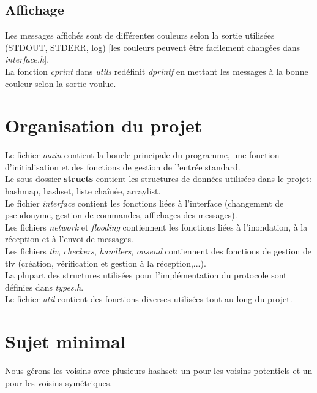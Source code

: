 \documentclass[a4paper,10pt]{article} %
\begin{document}
\subsection{Affichage}
Les messages affichés sont de différentes couleurs selon la sortie utilisées (STDOUT, STDERR, log) [les couleurs peuvent être facilement changées dans \textit{interface.h}].\\

La fonction \textit{cprint} dans \textit{utils} redéfinit \textit{dprintf} en mettant les messages à la bonne couleur selon la sortie voulue.

\section{Organisation du projet}
Le fichier \textit{main} contient la boucle principale du programme, une fonction d'initialisation et des fonctions de gestion de l'entrée standard.\\

Le sous-dossier \textbf{structs} contient les structures de données utilisées dans le projet: hashmap, hashset, liste chaînée, arraylist.\\

Le fichier \textit{interface} contient les fonctions liées à l'interface (changement de pseudonyme, gestion de commandes, affichages des messages).\\

Les fichiers \textit{network} et \textit{flooding} contiennent les fonctions liées à l'inondation, à la réception et à l'envoi de messages.\\

Les fichiers \textit{tlv}, \textit{checkers}, \textit{handlers}, \textit{onsend} contiennent des fonctions de gestion de tlv (création, vérification et gestion à la réception,...).\\

La plupart des structures utilisées pour l'implémentation du protocole sont définies dans \textit{types.h}.\\

Le fichier \textit{util} contient des fonctions diverses utilisées tout au long du projet.

\section{Sujet minimal}
Nous gérons les voisins avec plusieurs hashset: un pour les voisins potentiels et un pour les voisins symétriques.
\end{document}
